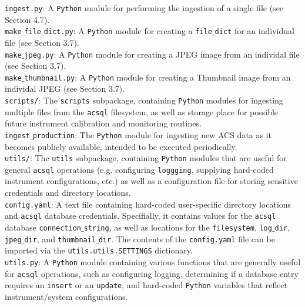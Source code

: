 \documentclass[10pt,journal,compsoc]{IEEEtran}
\begin{document}
\noindent\texttt{ingest.py}: A \texttt{Python} module for performing the ingestion of a single file (see Section 4.7).\\

\noindent\texttt{make$\_$file$\_$dict.py}: A \texttt{Python} module for creating a \texttt{file$\_$dict} for an individual file
(see Section 3.7).\\

\noindent\texttt{make$\_$jpeg.py}: A \texttt{Python} module for creating a JPEG image from an individal file (see Section 3.7).\\

\noindent\texttt{make$\_$thumbnail.py}: A \texttt{Python} module for creating a Thumbnail image from an individal JPEG (see Section 3.7).\\

\noindent\texttt{scripts/}: The \texttt{scripts} subpackage, containing \texttt{Python} modules for ingesting multiple files from
the \texttt{acsql} filesystem, as well as storage place for possible future instrument calibration and monitoring routines. \\

\noindent\texttt{ingest$\_$production}: The \texttt{Python} module for ingesting new ACS data as it becomes publicly available, intended
to be executed periodically.\\

\noindent\texttt{utils/}: The \texttt{utils} subpackage, containing \texttt{Python} modules that are useful for general \texttt{acsql}
operations (e.g. configuring \texttt{loggging}, supplying hard-coded instrument configurations, etc.) as well as a configuration file
for storing sensitive credentials and directory locations.\\

\noindent\texttt{config.yaml}: A text file containing hard-coded user-specific directory locations and \texttt{acsql} database
credentials.  Specifially, it contains values for the \texttt{acsql} database \texttt{connection$\_$string}, as well as locations for
the \texttt{filesystem}, \texttt{log$\_$dir}, \texttt{jpeg$\_$dir}, and \texttt{thumbnail$\_$dir}.  The contents of the \texttt{config.yaml}
file can be imported via the \texttt{utils.utils.SETTINGS} dictionary.\\

\noindent\texttt{utils.py}: A \texttt{Python} module containing various functions that are generally useful for \texttt{acsql} operations,
such as configuring logging, determining if a database entry requires an \texttt{insert} or an \texttt{update}, and hard-coded \texttt{Python}
variables that reflect instrument/system configurations.\\
\end{document}
